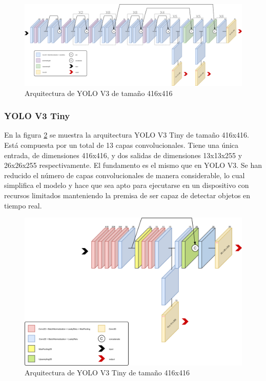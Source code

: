 \begin{figure}[H]
	\centering
	\includegraphics[width=\linewidth]{images/yolo_v3_architecture.png}
	\caption{Arquitectura de YOLO V3 de tamaño 416x416}
	\label{fig:yolov3architecture}
\end{figure}

\subsubsection*{YOLO V3 Tiny}

En la figura \ref{fig:yolov3tinyarchitecture} se muestra la arquitectura YOLO V3 Tiny de tamaño 416x416. Está compuesta por un total de 13 capas convolucionales. Tiene una única entrada, de dimensiones 416x416, y dos salidas de dimensiones 13x13x255 y 26x26x255 respectivamente. El fundamento es el mismo que en YOLO V3. Se han reducido el número de capas convolucionales de manera considerable, lo cual simplifica el modelo y hace que sea apto para ejecutarse en un dispositivo con recursos limitados manteniendo la premisa de ser capaz de detectar objetos en tiempo real.

\begin{figure}[H]
	\centering
	\includegraphics[width=\linewidth]{images/yolo_v3_tiny_architecture.png}
	\caption{Arquitectura de YOLO V3 Tiny de tamaño 416x416}
	\label{fig:yolov3tinyarchitecture}
\end{figure}

